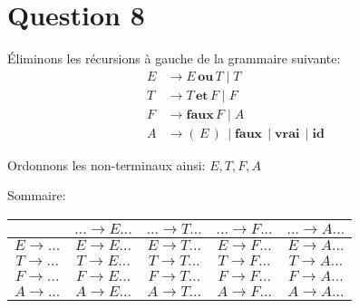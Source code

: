 \documentclass[class=article]{standalone}
\begin{document}
\section*{Question 8}

Éliminons les récursions à gauche de la grammaire suivante:
\begin{align*}
    E &\rightarrow E \, \textbf{ou} \, T \mid T\\
    T &\rightarrow T \, \textbf{et} \, F \mid F\\
    F &\rightarrow \textbf{faux} \, F \mid A\\
    A &\rightarrow ( \, E \, ) \, \mid \textbf{faux} \, \mid \textbf{vrai} \, \mid \textbf{id}
\end{align*}

Ordonnons les non-terminaux ainsi:
$E, T, F, A$ 

Sommaire:
\begin{center}
    \begin{tabular}{c|c|c|c|c|}
        \cellcolor[HTML]{FFFFFF}                     & 
        \cellcolor[HTML]{FFFFFF} $... \rightarrow E...$ &
        \cellcolor[HTML]{FFFFFF} $... \rightarrow T...$ & 
        \cellcolor[HTML]{FFFFFF} $... \rightarrow F...$ & 
        \cellcolor[HTML]{FFFFFF} $... \rightarrow A...$ \\
    \hline
        \cellcolor[HTML]{FFFFFF} $E \rightarrow ...$ & 
        \cellcolor[HTML]{FFFFFF} $E \rightarrow E...$ & 
        \cellcolor[HTML]{ABFF00} $E \rightarrow T...$ & 
        \cellcolor[HTML]{ABFF00} $E \rightarrow F...$ & 
        \cellcolor[HTML]{ABFF00} $E \rightarrow A...$ \\
    \hline
        \cellcolor[HTML]{FFFFFF} $T \rightarrow ...$ & 
        \cellcolor[HTML]{FFFFFF} $T \rightarrow E...$ & 
        \cellcolor[HTML]{FFFFFF} $T \rightarrow T...$ & 
        \cellcolor[HTML]{ABFF00} $T \rightarrow F...$ &
        \cellcolor[HTML]{ABFF00} $T \rightarrow A...$ \\
    \hline
        \cellcolor[HTML]{FFFFFF} $F \rightarrow ...$ &
        \cellcolor[HTML]{FFFFFF} $F \rightarrow E...$ &
        \cellcolor[HTML]{FFFFFF} $F \rightarrow T...$ & 
        \cellcolor[HTML]{FFFFFF} $F \rightarrow F...$ & 
        \cellcolor[HTML]{ABFF00} $F \rightarrow A...$ \\
    \hline
        \cellcolor[HTML]{FFFFFF} $A \rightarrow ...$ & 
        \cellcolor[HTML]{FFFFFF} $A \rightarrow E...$ & 
        \cellcolor[HTML]{FFFFFF} $A \rightarrow T...$ & 
        \cellcolor[HTML]{FFFFFF} $A \rightarrow F...$ & 
        \cellcolor[HTML]{FFFFFF} $A \rightarrow A...$ \\
    \hline
    \end{tabular}
\end{center}
\end{document}
